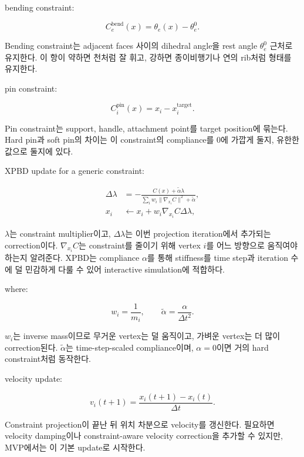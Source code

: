 \documentclass[11pt,a4paper]{article}
\begin{document}
bending constraint:

\begin{equation}
C_e^{\mathrm{bend}}(x)=\theta_e(x)-\theta_e^0.
\end{equation}

Bending constraint는 adjacent faces 사이의 dihedral angle을 rest angle $\theta_e^0$ 근처로 유지한다.
이 항이 약하면 천처럼 잘 휘고, 강하면 종이비행기나 연의 rib처럼 형태를 유지한다.

pin constraint:

\begin{equation}
C_i^{\mathrm{pin}}(x)=x_i-x_i^{\mathrm{target}}.
\end{equation}

Pin constraint는 support, handle, attachment point를 target position에 묶는다.
Hard pin과 soft pin의 차이는 이 constraint의 compliance를 0에 가깝게 둘지, 유한한 값으로 둘지에 있다.

XPBD update for a generic constraint:

\begin{align}
\Delta\lambda&=-\frac{C(x)+\widetilde{\alpha}\lambda}{\sum_iw_i\|\nabla_{x_i}C\|^2+\widetilde{\alpha}},\\
x_i&\leftarrow x_i+w_i\nabla_{x_i}C\Delta\lambda,
\end{align}

$\lambda$는 constraint multiplier이고, $\Delta\lambda$는 이번 projection iteration에서 추가되는 correction이다.
$\nabla_{x_i}C$는 constraint를 줄이기 위해 vertex $i$를 어느 방향으로 움직여야 하는지 알려준다.
XPBD는 compliance $\alpha$를 통해 stiffness를 time step과 iteration 수에 덜 민감하게 다룰 수 있어 interactive simulation에 적합하다.

where:

\begin{equation}
w_i=\frac{1}{m_i},\qquad \widetilde{\alpha}=\frac{\alpha}{\Delta t^2}.
\end{equation}

$w_i$는 inverse mass이므로 무거운 vertex는 덜 움직이고, 가벼운 vertex는 더 많이 correction된다.
$\widetilde{\alpha}$는 time-step-scaled compliance이며, $\alpha=0$이면 거의 hard constraint처럼 동작한다.

velocity update:

\begin{equation}
v_i(t+1)=\frac{x_i(t+1)-x_i(t)}{\Delta t}.
\end{equation}

Constraint projection이 끝난 뒤 위치 차분으로 velocity를 갱신한다.
필요하면 velocity damping이나 constraint-aware velocity correction을 추가할 수 있지만, MVP에서는 이 기본 update로 시작한다.
\end{document}
